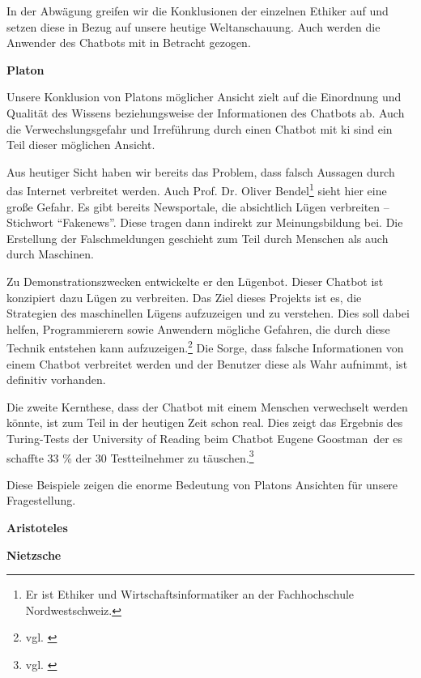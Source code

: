 In der Abwägung greifen wir die Konklusionen der einzelnen Ethiker auf und setzen diese in Bezug auf unsere heutige Weltanschauung. Auch werden die Anwender des Chatbots mit in Betracht gezogen.

\textbf{Platon}

Unsere Konklusion von Platons möglicher Ansicht zielt auf die Einordnung und Qualität des Wissens beziehungsweise der Informationen des Chatbots ab. Auch die Verwechslungsgefahr und Irreführung durch einen Chatbot mit \ac{ki} sind ein Teil dieser möglichen Ansicht.

Aus heutiger Sicht haben wir bereits das Problem, dass falsch Aussagen durch das Internet verbreitet werden. Auch Prof. Dr. Oliver Bendel\footnote{Er ist Ethiker und Wirtschaftsinformatiker an der Fachhochschule Nordwestschweiz.} sieht hier eine große Gefahr. 
Es gibt bereits Newsportale, die absichtlich Lügen verbreiten -- Stichwort \enquote{Fakenews}. 
Diese tragen dann indirekt zur Meinungsbildung bei. 
Die Erstellung der Falschmeldungen geschieht zum Teil durch Menschen als auch durch Maschinen. 

Zu Demonstrationszwecken entwickelte er den Lügenbot. Dieser Chatbot ist konzipiert dazu Lügen zu verbreiten. 
Das Ziel dieses Projekts ist es, die Strategien des maschinellen Lügens aufzuzeigen und zu verstehen. 
Dies soll dabei helfen, Programmierern sowie Anwendern mögliche Gefahren, die durch diese Technik entstehen kann aufzuzeigen.\footnote{vgl. \cite{Bendel}}  Die Sorge, dass falsche Informationen von einem Chatbot verbreitet werden und der Benutzer diese als Wahr aufnimmt, ist definitiv vorhanden.

Die zweite Kernthese, dass der Chatbot mit einem Menschen verwechselt werden könnte, ist zum Teil in der heutigen Zeit schon real.
Dies zeigt das Ergebnis des Turing-Tests der University of Reading beim Chatbot \glqq Eugene Goostman\grqq\, der es schaffte 33 \% der 30 Testteilnehmer zu täuschen.\footnote{vgl. \cite{UnivOfReading}} 

Diese Beispiele zeigen die enorme Bedeutung von Platons Ansichten für unsere Fragestellung. 

\textbf{Aristoteles}





\textbf{Nietzsche}





